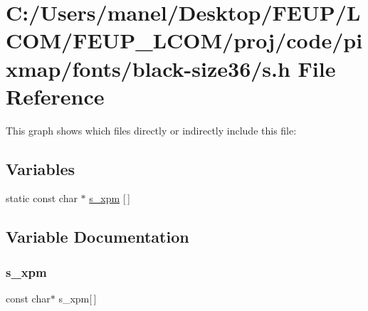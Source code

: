 \hypertarget{black-size36_2s_8h}{}\section{C\+:/\+Users/manel/\+Desktop/\+F\+E\+U\+P/\+L\+C\+O\+M/\+F\+E\+U\+P\+\_\+\+L\+C\+O\+M/proj/code/pixmap/fonts/black-\/size36/s.h File Reference}
\label{black-size36_2s_8h}
This graph shows which files directly or indirectly include this file\+:
\subsection*{Variables}
\begin{DoxyCompactItemize}
\item 
static const char $\ast$ \mbox{\hyperlink{black-size36_2s_8h_aebce0ed91c247ad983f2f14b15c2256e}{s\+\_\+xpm}} \mbox{[}$\,$\mbox{]}
\end{DoxyCompactItemize}


\subsection{Variable Documentation}
\mbox{\label{black-size36_2s_8h_aebce0ed91c247ad983f2f14b15c2256e}} 
\subsubsection{\texorpdfstring{s\_xpm}{s\_xpm}}
{\footnotesize\ttfamily const char$\ast$ s\+\_\+xpm\mbox{[}$\,$\mbox{]}\hspace{0.3cm}{\ttfamily [static]}}

